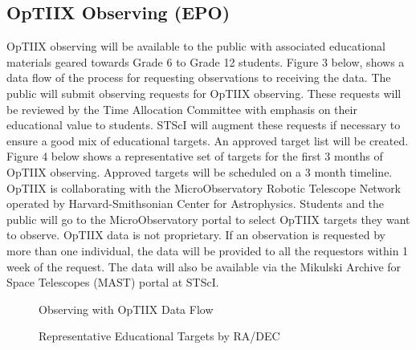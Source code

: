 \documentclass[11pt,twoside]{article}
\begin{document}
\subsection {OpTIIX Observing (EPO)}
OpTIIX observing will be available to the public with associated educational materials geared towards Grade 6 to Grade 12 students. Figure 3 below, shows a data flow of the process for requesting observations to receiving the data.  The public will submit observing requests for OpTIIX observing.   These requests will be reviewed by the Time Allocation Committee with emphasis on their educational value to students. STScI will augment these requests if necessary to ensure a good mix of educational targets.  An approved target list will be created.  Figure 4 below shows a representative set of targets for the first 3 months of OpTIIX observing.  Approved targets will be scheduled on a 3 month timeline.  OpTIIX is collaborating with the MicroObservatory Robotic Telescope Network operated by Harvard-Smithsonian Center for Astrophysics.  Students and the public will go to the MicroObservatory portal to select OpTIIX targets they want to observe.  OpTIIX data is not proprietary.   If an observation is requested by more than one individual, the data will be provided to all the requestors within 1 week of the request.  The data will also be available via the Mikulski Archive for Space Telescopes (MAST) portal at STScI.

\begin{figure}[ht!]
\caption{Observing with OpTIIX Data Flow}
\end{figure}

\begin{figure}[ht!]
\caption{Representative Educational Targets by RA/DEC}
\end{figure}
\end{document}
